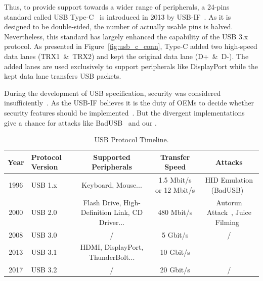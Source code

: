 Thus, to provide support towards a wider range of peripherals, a 24-pins
standard called \ac{USB} Type-C~\cite{typec} is introduced in 2013 by \ac{USB}-IF~\cite{usbif}. As it is designed to be double-sided, the number of actually usable
pins is halved. Nevertheless, this standard has largely enhanced the capability
of the \ac{USB} 3.x protocol. As presented in Figure~\ref{fig:usb_c_conn}, Type-C added
two high-speed data lanes \mbox{(TRX1 \& TRX2)} and kept the original data lane \mbox{(D+ \&
D-)}. The added lanes are used exclusively to support peripherals like
DisplayPort while the kept data lane transfers \ac{USB} packets.

During the development of \ac{USB} specification, security was considered insufficiently~\cite{sok}. As
the \ac{USB}-IF believes it is the duty of \acp{OEM}
to decide whether security features should be implemented~\cite{usbsec}. But the divergent implementations give a chance for attacks like
BadUSB~\cite{rubber} and our \tool.

\begin{table}
\begin{tabular}{|c|l|c|c|c|}
	\hline
	\textbf{Year} & \textbf{Protocol Version} & \textbf{Supported Peripherals} & \textbf{Transfer Speed} & \textbf{Attacks} \\
	\hline
	1996 & \ac{USB} 1.x~\cite{usb10,usb11} & Keyboard, Mouse... & 1.5 Mbit/s or 12 Mbit/s & \ac{HID} Emulation (BadUSB)~\cite{badusb} \\
	\hline
	2000 & \ac{USB} 2.0~\cite{usb20} & Flash Drive, High-Definition Link, CD Driver... & 480 Mbit/s & Autorun Attack~\cite{duqu}, Juice Filming~\cite{JFC,JFCImpact} \\
	\hline
	2008 & \ac{USB} 3.0~\cite{usb30} & / & 5 Gbit/s & / \\
	\hline
	2013 & \ac{USB} 3.1~\cite{usb31} & HDMI, DisplayPort, ThunderBolt... & 10 Gbit/s & \tool \\
	\hline
	2017 & \ac{USB} 3.2~\cite{usb32} & / & 20 Gbit/s & / \\
	\hline
\end{tabular}
	\linebreak
\caption{\ac{USB} Protocol Timeline.}
\label{table:usb_timeline}
\end{table}
